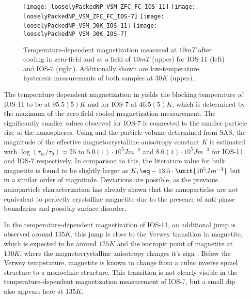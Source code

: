 \documentclass[\main/dresen_thesis.tex]{subfiles}
\begin{document}
  \begin{figure}[tb]
    \centering
    \texttt{[image: looselyPackedNP\_VSM\_ZFC\_FC\_IOS-11]}
    \texttt{[image: looselyPackedNP\_VSM\_ZFC\_FC\_IOS-7]}
    \texttt{[image: looselyPackedNP\_VSM\_30K\_IOS-11]}
    \texttt{[image: looselyPackedNP\_VSM\_30K\_IOS-7]}
    \caption{\label{fig:looselyPackedNP:nanoparticle:vsm10}Temperature-dependent magnetization measured at $10 \unit{mT}$ after cooling in zero-field and at a field of $10 \unit{mT}$ (upper) for IOS-11 (left) and IOS-7 (right). Additionally shown are low-temperature hysteresis measurements of both samples at $30 \unit{K}$ (upper).}
  \end{figure}
  The temperature dependent magnetization in  yields the blocking temperature of IOS-11 to be at $95.5(5) \unit{K}$ and for IOS-7 at $46.5(5) \unit{K}$, which is determined by the maximum of the zero-field cooled magnetization measurement.
  The significantly smaller values observed for IOS-7 is connected to the smaller particle size of the nanospheres.
  Using  and the particle volume determined from SAS, the magnitude of the effective magnetocrystalline anisotropy constant $K$ is estimated with $\log(\tau_m / \tau_0) \approx 25$ to $5.0(1) \cdot \unit{10^{5} J m^{-3}}$ and $8.6(1)\cdot \unit{10^{5} J m^{-3}}$ for IOS-11 and IOS-7 respectively.
  In comparison to this, the literature value for bulk magnetite is found to be slightly larger as $K_1 \eq -13.5 \cdot  \unit{10^{5} J m^{-3}}$ \cite{Goya_2003_Stati} but in a similar order of magnitude.
  Deviations are possible, as the previous nanoparticle characterization has already shown that the nanoparticles are not equivalent to perfectly crystalline magnetite due to the presence of anti-phase boundaries and possibly surface disorder.

  In the temperature-dependent magnetization of IOS-11, an additional jump is observed around $135 \unit{K}$, this jump is close to the Verwey transition in magnetite, which is expected to be around $125 \unit{K}$ \cite{Walz_2002_Theve} and the isotropic point of magnetite at $130 \unit{K}$, where the magnetocrystalline anisotropy changes it's sign \cite{Muxworthy_1999_Lowte}.
  Below the Verwey temperature, magnetite is known to change from a cubic inverse spinel structure to a monoclinic structure.
  This transition is not clearly visible in the temperature-dependent magnetization measurement of IOS-7, but a small dip also appears here at $135 \unit{K}$.
\end{document}
